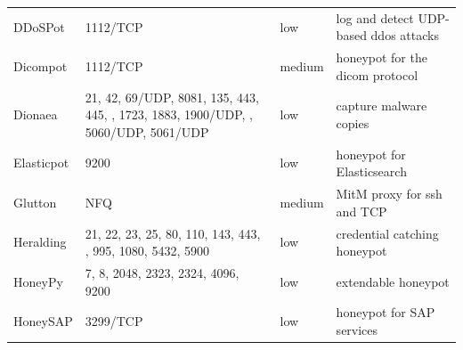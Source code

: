 \begin{table}
\begin{tabularx}{\linewidth}{l|XlX}
        DDoSPot \cite{ddosspot2021}               & 1112/TCP                                                                                                    & low                        & log and detect UDP-based \ac{ddos} attacks                                           \\
        Dicompot \cite{dicompot2021}              & 1112/TCP                                                                                                    & medium                     & honeypot for the \ac{dicom} protocol                                                 \\
        Dionaea \cite{dionaea2021}                & 21, 42, 69/UDP, 8081, 135, 443, 445, \newline 1433, 1723, 1883, 1900/UDP, \newline 3306, 5060/UDP, 5061/UDP & low                        & capture malware copies                                                               \\
        Elasticpot \cite{elasticpot2021}          & 9200                                                                                                        & low                        & honeypot for Elasticsearch                                                           \\
        Glutton \cite{glutton2021}                & NFQ                                                                                                         & medium                     & MitM proxy for \ac{ssh} and TCP                                                      \\
        Heralding \cite{heralding2021}            & 21, 22, 23, 25, 80, 110, 143, 443, \newline 993, 995, 1080, 5432, 5900                                      & low                        & credential catching honeypot                                                         \\
        HoneyPy \cite{honeysap2021}               & 7, 8, 2048, 2323, 2324, 4096, 9200                                                                          & low                        & extendable honeypot                                                                  \\
        HoneySAP \cite{honeysap2021}              & 3299/TCP                                                                                                    & low                        & honeypot for SAP services                                                            \\

\end{tabularx}
\end{table}

